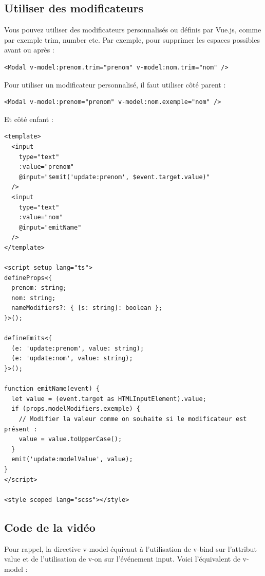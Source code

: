 \documentclass{article}
\begin{document}
\subsection{Utiliser des modificateurs}
Vous pouvez utiliser des modificateurs personnalisés ou définis par {\color{monOrange}Vue.js}, comme par exemple {\color{monOrange}trim, number} etc. Par exemple, pour supprimer les espaces possibles avant ou après :
\begin{verbatim}
<Modal v-model:prenom.trim="prenom" v-model:nom.trim="nom" />
\end{verbatim}
Pour utiliser un modificateur personnalisé, il faut utiliser côté parent :
\begin{verbatim}
<Modal v-model:prenom="prenom" v-model:nom.exemple="nom" />
\end{verbatim}
Et côté enfant :
\begin{verbatim}
<template>
  <input
    type="text"
    :value="prenom"
    @input="$emit('update:prenom', $event.target.value)"
  />
  <input
    type="text"
    :value="nom"
    @input="emitName"
  />
</template>

<script setup lang="ts">
defineProps<{
  prenom: string;
  nom: string;
  nameModifiers?: { [s: string]: boolean };
}>();

defineEmits<{
  (e: 'update:prenom', value: string);
  (e: 'update:nom', value: string);
}>();

function emitName(event) {
  let value = (event.target as HTMLInputElement).value;
  if (props.modelModifiers.exemple) {
    // Modifier la valeur comme on souhaite si le modificateur est présent :
    value = value.toUpperCase();
  }
  emit('update:modelValue', value);
}
</script>

<style scoped lang="scss"></style>
\end{verbatim}
\subsection{Code de la vidéo}
Pour rappel, la directive {\color{monOrange}v-model} équivaut à l'utilisation de {\color{monOrange}v-bind} sur l'attribut value et de l'utilisation de {\color{monOrange}v-on} sur l'événement {\color{monOrange}input}. Voici l'équivalent de {\color{monOrange}v-model} :
\end{document}

